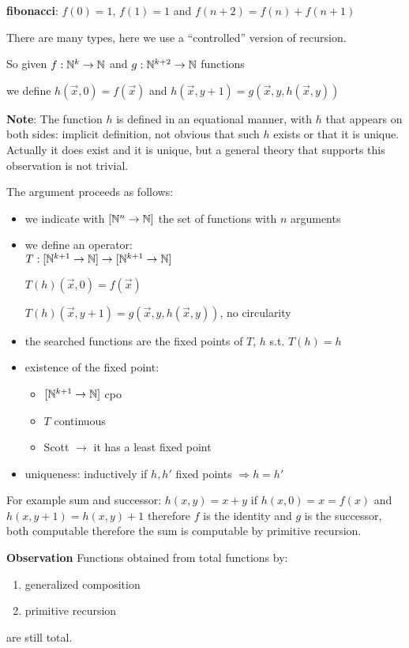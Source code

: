 \textbf{fibonacci}: $f(0) = 1$, $f(1) = 1$ and $f(n+2) = f(n) + f(n+1)$

There are many types, here we use a ``controlled'' version of recursion.

So given $f:\mathbb{N}^k\rightarrow\mathbb{N}$ and $g:\mathbb{N}^{k+2}\rightarrow\mathbb{N}$ functions

we define $ h(\vec{x},0) = f(\vec{x}) $ and $ h(\vec{x}, y+1) = g(\vec{x},y,h(\vec{x},y)) $

\textbf{Note}: The function $h$ is defined in an equational manner, with $h$ that appears on both sides: implicit definition, not obvious that such $h$ exists or that it is unique. Actually it does exist and it is unique, but a general theory that supports this observation is not trivial.

The argument proceeds as follows:

\begin{itemize}
\item we indicate with $[\mathbb{N}^n\rightarrow\mathbb{N}]$ the set of functions with $n$ arguments
\item we define an operator:\\
  $T: [\mathbb{N}^{k+1}\rightarrow\mathbb{N}] \rightarrow [\mathbb{N}^{k+1}\rightarrow\mathbb{N}]$

  $T(h)(\vec{x},0) = f(\vec{x})$

  $T(h)(\vec{x},y+1) = g(\vec{x},y,h(\vec{x},y))$, no circularity
\item the searched functions are the fixed points of $T$, $h$ s.t. $T(h) = h$
\item existence of the fixed point:
  \begin{itemize}
  \item $[\mathbb{N}^{k+1}\rightarrow\mathbb{N}]$ cpo
  \item $T$ continuous
  \item Scott $\rightarrow$ it has a least fixed point
  \end{itemize}
\item uniqueness: inductively if $h,h'$ fixed points $\Rightarrow h=h'$
\end{itemize}

For example sum and successor: $ h(x,y) = x+y $ if $ h(x,0) = x = f(x) $ and $ h(x,y+1) = h(x,y) + 1 $ therefore $f$ is the identity and $g$ is the successor, both computable therefore the sum is computable by primitive recursion.

\textbf{Observation}
Functions obtained from total functions by:
\begin{enumerate}
\item generalized composition
\item primitive recursion
\end{enumerate}
are still total.

